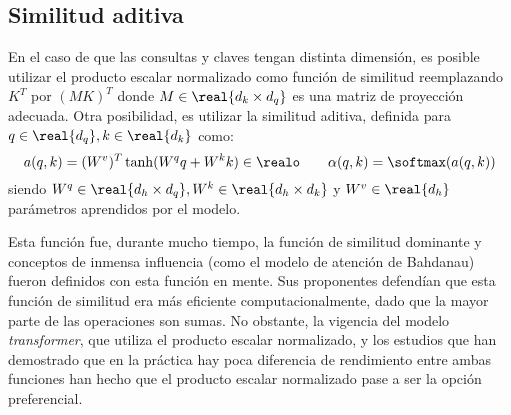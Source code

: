 \subsection{Similitud aditiva}
En el caso de que las consultas y claves tengan distinta dimensión, es posible utilizar el producto escalar normalizado como función de similitud reemplazando \( K^T \) por \(  (MK)^T \) donde \( M \in \real{d_k \times d_q }\) es una matriz de proyección adecuada. Otra posibilidad, es utilizar la similitud aditiva, definida para \( q \in \real{d_q}, k \in \real{d_k} \) como:
\[
    a(q, k) = (W^v)^T \tanh(W^q q + W^k k) \in \realo \qquad \alpha(q ,k) = \softmax(a(q,k))
\]
siendo \( W^q \in \real{d_h \times d_q}, W^k \in \real{d_h \times d_k} \) y \( W^v \in \real{d_h} \)
parámetros aprendidos por el modelo.

Esta función fue, durante mucho tiempo, la función de similitud dominante y conceptos de inmensa influencia (como el modelo de atención de Bahdanau) fueron definidos con esta función en mente. Sus proponentes defendían que esta función de similitud era más eficiente computacionalmente, dado que la mayor parte de las operaciones son sumas. No obstante, la vigencia del modelo \textit{transformer}, que utiliza el producto escalar normalizado, y los estudios que han demostrado que en la práctica hay poca diferencia de rendimiento entre ambas funciones han hecho que el producto escalar normalizado pase a ser la opción preferencial.
